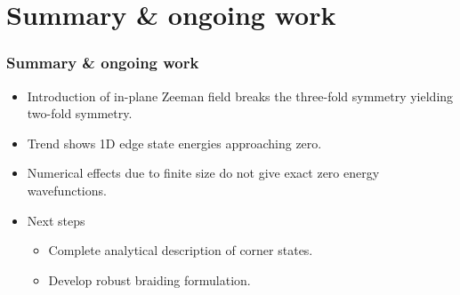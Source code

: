 \documentclass[xcolor=dvipsnames,10pt,aspectratio=169]{beamer}
\newcommand{\CO}{Summary \& ongoing work}
\begin{document}
  \section[Summary]{\CO}
  \begin{frame}
    \frametitle{\CO}
    \begin{itemize}
      \item Introduction of in-plane Zeeman field breaks the three-fold symmetry yielding two-fold symmetry.
      \item Trend shows 1D edge state energies approaching zero.
      \item Numerical effects due to finite size do not give exact zero energy wavefunctions.
      \item Next steps
        \begin{itemize}
          \item Complete analytical description of corner states.
          \item Develop robust braiding formulation.
        \end{itemize}
    \end{itemize}
  \end{frame}
\end{document}
